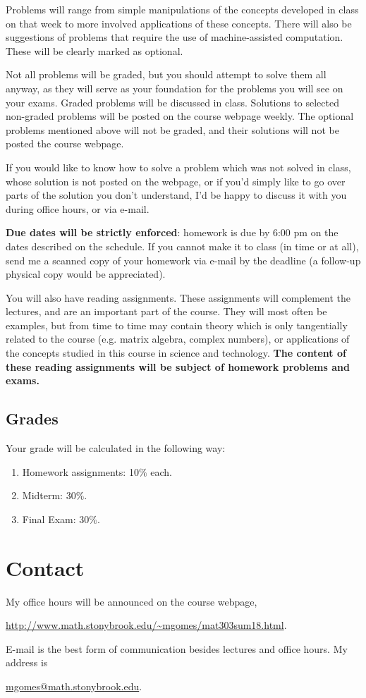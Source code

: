 \documentclass[11pt]{amsart}
\numberwithin{equation}{section}
\begin{document}
    Problems will range from simple manipulations of the concepts developed in class on that week to more involved applications of these concepts. There will also be suggestions of problems that require the use of machine-assisted computation. These will be clearly marked as optional.
    
    Not all problems will be graded, but you should attempt to solve them all anyway, as they will serve as your foundation for the problems you will see on your exams. Graded problems will be discussed in class. Solutions to selected non-graded problems will be posted on the course webpage weekly.  The optional problems mentioned above will not be graded, and their solutions will not be posted the course webpage. 
    
    If you would like to know how to solve a problem which was not solved in class, whose solution is not posted on the webpage, or if you'd simply like to go over parts of the solution you don't understand, I'd be happy to discuss it with you during office hours, or via e-mail. 
    
    \textbf{Due dates will be strictly enforced}: homework is due by 6:00 pm on the dates described on the schedule. If you cannot make it to class (in time or at all), send me a scanned copy of your homework via e-mail by the deadline (a follow-up physical copy would be appreciated).
    
      You will also have reading assignments. These assignments will complement the lectures, and are an important part of the course. They will most often be examples, but from time to time may contain theory which is only tangentially related to the course (e.g. matrix algebra, complex numbers), or applications of the concepts studied in this course in science and technology. \textbf{The content of these reading assignments will be subject of homework problems and exams.}

\subsection{Grades}
Your grade will be calculated in the following way:
\begin{enumerate}
\item Homework assignments: 10$\%$ each.
\item Midterm: 30$\%$.
\item Final Exam: 30$\%$.
\end{enumerate}

\section{Contact}
My office hours will be announced on the course webpage, 
\begin{center}
\url{http://www.math.stonybrook.edu/~mgomes/mat303sum18.html}.
\end{center}
E-mail is the best form of communication besides lectures and office hours. My address is 
\begin{center}
\href{mailto: mgomes@math.stonybrook.edu}{mgomes@math.stonybrook.edu}.
\end{center}
\end{document}
